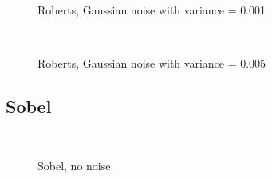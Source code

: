 \documentclass[10pt,a4paper]{article}
\begin{document}
\begin{figure}
  \centering
     \\
  \caption{Roberts, Gaussian noise with variance = 0.001}
  \label{fig:robert_001}
\end{figure}

\begin{figure}
  \centering
     \\
  \caption{Roberts, Gaussian noise with variance = 0.005}
  \label{fig:robert_005}
\end{figure}

\subsection{Sobel}
\begin{figure}
  \centering
     \\
  \caption{Sobel, no noise}
  \label{fig:sobel_no_noise}
\end{figure}
\end{document}
